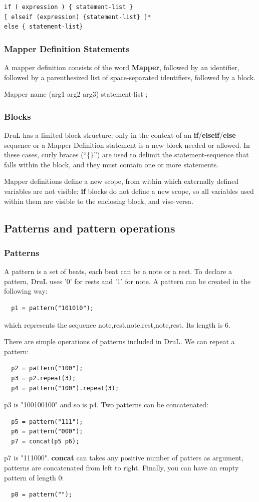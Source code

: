 \documentclass[11pt,twoside]{article}
\begin{document}
\begin{verbatim}
if ( expression ) { statement-list } 
[ elseif (expression) {statement-list} ]*
else { statement-list}
\end{verbatim}

\subsubsection{Mapper Definition Statements}

A mapper definition consists of the word \textbf{Mapper}, followed by an identifier, followed by a parenthesized list of space-separated identifiers, followed by a block.


Mapper name (arg1 arg2  arg3) {
	statement-list
};

\subsubsection{Blocks}
DruL has a limited block structure: only in the context of an \textbf{if}/\textbf{elseif}/\textbf{else} sequence or a Mapper Definition statement is a new block needed or allowed.  In these cases, curly braces (``\{\}'') are used to delimit the statement-sequence that falls within the block, and they must contain one or more statements.

Mapper definitions define a new scope, from within which externally defined variables are not visible; \textbf{if} blocks do not define a new scope, so all variables used within them are visible to the enclosing  block, and vise-versa.

\subsection{Patterns and pattern operations}

\subsubsection{Patterns}
A pattern is a set of beats, each beat can be a note or a rest.
To declare a pattern, DruL uses '0' for rests and '1' for note.
A pattern can be created in the following way:
\begin{verbatim}
  p1 = pattern("101010");
\end{verbatim}
which represents the sequence {note,rest,note,rest,note,rest}.
Its length is $6$.

There are simple operations of patterns included in DruL. We
can repeat a pattern:
\begin{verbatim}
  p2 = pattern("100");
  p3 = p2.repeat(3);
  p4 = pattern("100").repeat(3);
\end{verbatim}
p3 is "100100100" and so is p4. Two patterns can be concatenated:
\begin{verbatim}
  p5 = pattern("111");
  p6 = pattern("000");
  p7 = concat(p5 p6);
\end{verbatim}
p7 is "111000". \textbf{concat} can takes any positive number of
patters as argument, patterns are concatenated from left to right.
Finally, you can have an empty pattern of length 0:
\begin{verbatim}
  p8 = pattern("");
\end{verbatim}
\end{document}
